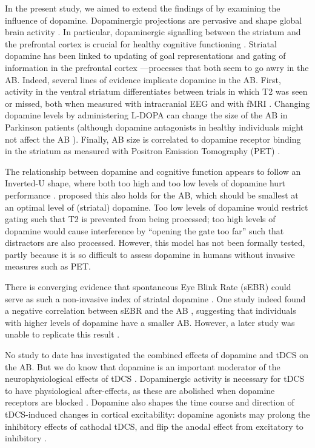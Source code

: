 \documentclass[11pt,]{memoir}
\begin{document}
In the present study, we aimed to extend the findings of \textcite{London2015} by examining the influence of dopamine. Dopaminergic projections are pervasive and shape global brain activity \autocites{Schultz2007}{Bjorklund2007}. In particular, dopaminergic signalling between the striatum and the prefrontal cortex is crucial for healthy cognitive functioning \autocites{Nieoullon2002}{Robbins2009}. Striatal dopamine has been linked to updating of goal representations and gating of information in the prefrontal cortex \autocites{Cohen2004}{Cools2011}---processes that both seem to go awry in the AB. Indeed, several lines of evidence implicate dopamine in the AB. First, activity in the ventral striatum differentiates between trials in which T2 was seen or missed, both when measured with intracranial EEG \autocite{Slagter2017} and with fMRI \autocite{Slagter2010}. Changing dopamine levels by administering L-DOPA can change the size of the AB in Parkinson patients \autocite{Slagter2016a} (although dopamine antagonists in healthy individuals might not affect the AB \autocite{Gibbs2007}). Finally, AB size is correlated to dopamine receptor binding in the striatum as measured with Positron Emission Tomography (PET) \autocite{Slagter2012}.

The relationship between dopamine and cognitive function appears to follow an Inverted-U shape, where both too high and too low levels of dopamine hurt performance \autocite{Cools2011}. \textcite{Slagter2012} proposed this also holds for the AB, which should be smallest at an optimal level of (striatal) dopamine. Too low levels of dopamine would restrict gating such that T2 is prevented from being processed; too high levels of dopamine would cause interference by ``opening the gate too far'' such that distractors are also processed. However, this model has not been formally tested, partly because it is so difficult to assess dopamine in humans without invasive measures such as PET.

There is converging evidence that spontaneous Eye Blink Rate (sEBR) could serve as such a non-invasive index of striatal dopamine \autocite[for a review, see][]{Jongkees2016}. One study indeed found a negative correlation between sEBR and the AB \autocite{Colzato2008}, suggesting that individuals with higher levels of dopamine have a smaller AB. However, a later study was unable to replicate this result \autocite{Slagter2013}.

No study to date has investigated the combined effects of dopamine and tDCS on the AB. But we do know that dopamine is an important moderator of the neurophysiological effects of tDCS \autocite{Stagg2011b}. Dopaminergic activity is necessary for tDCS to have physiological after-effects, as these are abolished when dopamine receptors are blocked \autocite{Nitsche2006}. Dopamine also shapes the time course and direction of tDCS-induced changes in cortical excitability: dopamine agonists may prolong the inhibitory effects of cathodal tDCS, and flip the anodal effect from excitatory to inhibitory \autocite{Kuo2008}.
\end{document}
